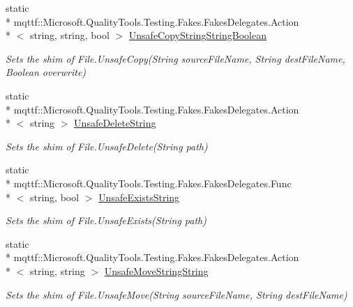 \begin{DoxyCompactItemize}
static \\*
mqttf\-::\-Microsoft.\-Quality\-Tools.\-Testing.\-Fakes.\-Fakes\-Delegates.\-Action\\*
$<$ string, string, bool $>$ \hyperlink{class_system_1_1_i_o_1_1_fakes_1_1_shim_file_a4e3c2ab71fc9cce4782e8921bdf5e5c6}{Unsafe\-Copy\-String\-String\-Boolean}
\begin{DoxyCompactList}\small\item\em Sets the shim of File.\-Unsafe\-Copy(\-String source\-File\-Name, String dest\-File\-Name, Boolean overwrite)\end{DoxyCompactList}\item 
static \\*
mqttf\-::\-Microsoft.\-Quality\-Tools.\-Testing.\-Fakes.\-Fakes\-Delegates.\-Action\\*
$<$ string $>$ \hyperlink{class_system_1_1_i_o_1_1_fakes_1_1_shim_file_ac258c5ff8962752418d900d12f905ab1}{Unsafe\-Delete\-String}
\begin{DoxyCompactList}\small\item\em Sets the shim of File.\-Unsafe\-Delete(\-String path)\end{DoxyCompactList}\item 
static \\*
mqttf\-::\-Microsoft.\-Quality\-Tools.\-Testing.\-Fakes.\-Fakes\-Delegates.\-Func\\*
$<$ string, bool $>$ \hyperlink{class_system_1_1_i_o_1_1_fakes_1_1_shim_file_a8c1dafef3fe1be775d62fbac4632b5ac}{Unsafe\-Exists\-String}
\begin{DoxyCompactList}\small\item\em Sets the shim of File.\-Unsafe\-Exists(\-String path)\end{DoxyCompactList}\item 
static \\*
mqttf\-::\-Microsoft.\-Quality\-Tools.\-Testing.\-Fakes.\-Fakes\-Delegates.\-Action\\*
$<$ string, string $>$ \hyperlink{class_system_1_1_i_o_1_1_fakes_1_1_shim_file_a541634a1c748de85b427b1e9b7fece72}{Unsafe\-Move\-String\-String}
\begin{DoxyCompactList}\small\item\em Sets the shim of File.\-Unsafe\-Move(\-String source\-File\-Name, String dest\-File\-Name)\end{DoxyCompactList}\item 

\end{DoxyCompactItemize}
